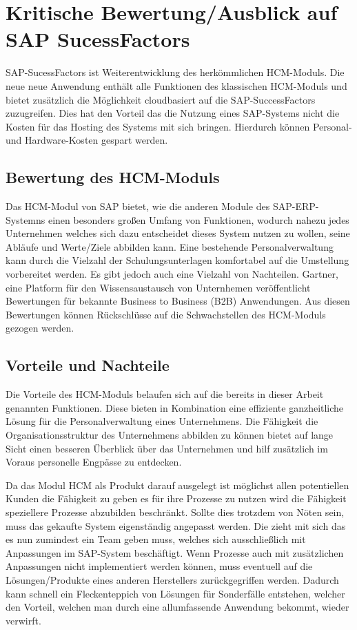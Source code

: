 
\section{Kritische Bewertung/Ausblick auf SAP SucessFactors} 
\label{sec:bewertungundausblick}

SAP-SucessFactors ist Weiterentwicklung des herkömmlichen HCM-Moduls. Die neue neue Anwendung enthält alle Funktionen des klassischen HCM-Moduls und bietet zusätzlich die Möglichkeit cloudbasiert auf die SAP-SuccessFactors zuzugreifen. Dies hat den Vorteil das die Nutzung eines SAP-Systems nicht die Kosten für das Hosting des Systems mit sich bringen. Hierdurch können Personal- und Hardware-Kosten gespart werden. 

\subsection{Bewertung des HCM-Moduls}
Das HCM-Modul von SAP bietet, wie die anderen Module des SAP-ERP-Systemns einen besonders großen Umfang von Funktionen, wodurch nahezu jedes Unternehmen welches sich dazu entscheidet dieses System nutzen zu wollen, seine Abläufe und Werte/Ziele abbilden kann. Eine bestehende Personalverwaltung kann durch die Vielzahl der Schulungsunterlagen komfortabel auf die Umstellung vorbereitet werden. Es gibt jedoch auch eine Vielzahl von Nachteilen. Gartner, eine Platform für den Wissensaustausch von Unternhemen veröffentlicht Bewertungen für bekannte Business to Business (B2B) Anwendungen. Aus diesen Bewertungen können Rückschlüsse auf die Schwachstellen des HCM-Moduls gezogen werden. 

\subsection{Vorteile und Nachteile}
Die Vorteile des HCM-Moduls belaufen sich auf die bereits in dieser Arbeit genannten Funktionen. Diese bieten in Kombination eine effiziente ganzheitliche Lösung für die Personalverwaltung eines Unternehmens. Die Fähigkeit die Organisationsstruktur des Unternehmens abbilden zu können bietet auf lange Sicht einen besseren Überblick über das Unternehmen und hilf zusätzlich im Voraus personelle Engpässe zu entdecken. 

Da das Modul HCM als Produkt darauf ausgelegt ist möglichst allen potentiellen Kunden die Fähigkeit zu geben es für ihre Prozesse zu nutzen wird die Fähigkeit speziellere Prozesse abzubilden beschränkt. Sollte dies trotzdem von Nöten sein, muss das gekaufte System eigenständig angepasst werden. Die zieht mit sich das es nun zumindest ein Team geben muss, welches sich ausschließlich mit Anpassungen im SAP-System beschäftigt. Wenn Prozesse auch mit zusätzlichen Anpassungen nicht implementiert werden können, muss eventuell auf die Lösungen/Produkte eines anderen Herstellers zurückgegriffen werden. Dadurch kann schnell ein Fleckenteppich von Lösungen für Sonderfälle entstehen, welcher den Vorteil, welchen man durch eine allumfassende Anwendung bekommt, wieder verwirft. 

